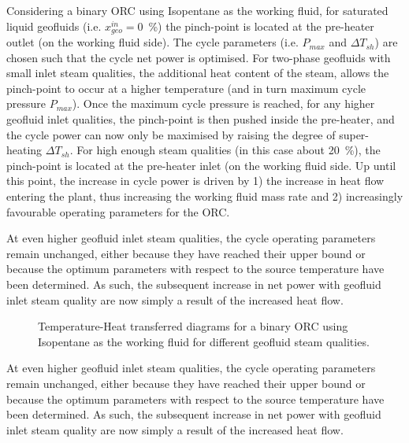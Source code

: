     Considering a binary \ac{ORC} using Isopentane as the working fluid, for saturated liquid geofluids (i.e. \(x_{geo}^{in}=\)\qty{0}{\percent}) the pinch-point is located at the pre-heater outlet (on the working fluid side). The cycle parameters (i.e. \(P_{max}\) and \(\Delta T_{sh}\)) are chosen such that the cycle net power is optimised. For two-phase geofluids with small inlet steam qualities, the additional heat content of the steam, allows the pinch-point to occur at a higher temperature (and in turn maximum cycle pressure \(P_{max}\)). Once the maximum cycle pressure is reached, for any higher geofluid inlet qualities, the pinch-point is then pushed inside the pre-heater, and the cycle power can now only be maximised by raising the degree of super-heating \(\Delta T_{sh}\). For high enough steam qualities (in this case about \qty{20}{\percent}), the pinch-point is located at the pre-heater inlet (on the working fluid side. Up until this point, the increase in cycle power is driven by 1) the increase in heat flow entering the plant, thus increasing the working fluid mass rate and 2) increasingly favourable operating parameters for the \ac{ORC}. 
    
    At even higher geofluid inlet steam qualities, the cycle operating parameters remain unchanged, either because they have reached their upper bound or because the optimum parameters with respect to the source temperature have been determined. As such, the subsequent increase in net power with geofluid inlet steam quality are now simply a result of the increased heat flow.

    \begin{figure}[H]
        \centering
        
        \caption[TQ diagrams for a binary \ac{ORC} using Isopentane as the working fluid by steam quality.]{Temperature-Heat transferred diagrams for a binary \ac{ORC} using Isopentane as the working fluid for different geofluid steam qualities.}
        \label{fig:prosim_purewater_isopentane_TQ_by_Q}
    \end{figure}        

    At even higher geofluid inlet steam qualities, the cycle operating parameters remain unchanged, either because they have reached their upper bound or because the optimum parameters with respect to the source temperature have been determined. As such, the subsequent increase in net power with geofluid inlet steam quality are now simply a result of the increased heat flow.

